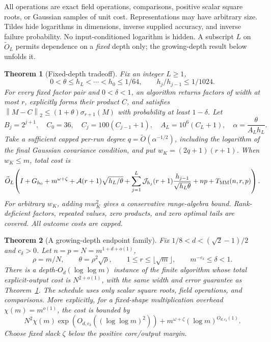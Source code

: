 \documentclass[11pt]{article}
\newtheorem{theorem}{Theorem}
\newcommand{\norm}[1]{\left\lVert#1\right\rVert}
\newcommand{\tO}{\widetilde O}
\newcommand{\MM}{T_{\rm MM}}
\newcommand{\Ac}{\mathcal A}
\newcommand{\Jc}{\mathcal J}
\begin{document}
All operations are exact field operations, comparisons, positive scalar
square roots, or Gaussian samples of unit cost. Representations may have
arbitrary size. Tildes hide logarithms in dimensions, inverse supplied
accuracy, and inverse failure probability. No input-conditioned logarithm
is hidden. A subscript \(L\) on \(\tO_L\) permits dependence on a
\emph{fixed} depth only; the growing-depth result below unfolds it.

\begin{theorem}[Fixed-depth tradeoff]\label{thm:fixed}
Fix an integer \(L\geq1\),
\[
 0<\theta\leq h_L<\cdots<h_0\leq1/64,
 \qquad h_j/h_{j-1}\leq1/1024.
\]
For every fixed factor pair and \(0<\delta<1\), an algorithm returns
factors of width at most \(r\), explicitly forms their product \(C\),
and satisfies
\(\norm{M-C}_2\leq(1+\theta)\sigma_{r+1}(M)\)
with probability at least \(1-\delta\).
Let
\[
 B_j=2^{j+1},\quad C_0=36,\quad C_j=100(C_{j-1}+1),\quad
 A_L=10^6(C_L+1),\quad \alpha=\frac{\theta}{A_Lh_L}.
\]
Take a sufficient capped per-run degree
\(q=\tO(\alpha^{-1/2})\), including the logarithm of the final
Gaussian covariance condition, and put \(w_K=(2q+1)(r+1)\).
When \(w_K\leq m\), total cost is
\begin{equation}\label{eq:fixedcost}
 \tO_L\!\left(I+G_{h_0}+m^{\omega+\zeta}
 +\Ac(r+1)\sqrt{h_L/\theta}
 +\sum_{j=1}^L\Jc_{h_j}(r+1)
                    \frac{h_{j-1}}{\sqrt{h_L\theta}}
 +np+\MM(n,r,p)\right).
\end{equation}
For arbitrary \(w_K\), adding \(m w_K^2\) gives a conservative
range-algebra bound. Rank-deficient factors, repeated values, zero
products, and zero optimal tails are covered. All outcome costs are capped.
\end{theorem}

\begin{theorem}[A growing-depth endpoint family]\label{thm:family}
Fix \(1/8<d<(\sqrt2-1)/2\) and \(c_\delta>0\).
Let \(n=p=N=m^{1+d+o(1)}\),
\[
 \rho=m/N,\qquad \theta=\rho^2\sqrt\rho,\qquad
 1\leq r\leq\lfloor\sqrt m\rfloor,
 \qquad m^{-c_\delta}\leq\delta<1.
\]
There is a depth-\(O_d(\log\log m)\) instance of the finite algorithm
whose total explicit-output cost is \(N^{2+o(1)}\), with the same
width and error guarantee as Theorem~\ref{thm:fixed}.
The schedule uses only scalar square roots, field operations, and
comparisons. More explicitly, for a fixed-shape multiplication overhead
\(\chi(m)=m^{o(1)}\), the cost is bounded by
\begin{equation}\label{eq:unfolded}
 N^2\chi(m)\exp\!\left(O_{d,c_\delta}((\log\log m)^2)\right)
       +m^{\omega+\zeta}(\log m)^{O_{d,c_\delta}(1)}.
\end{equation}
Choose fixed slack \(\zeta\) below the positive core/output margin.
\end{theorem}
\end{document}
